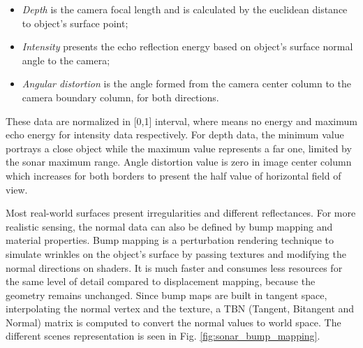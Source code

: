 \documentclass[final,5p,times]{elsarticle}
\begin{document}
\begin{itemize}[(a)]
    \item \textit{Depth} is the camera focal length and is calculated by the euclidean distance to object's surface point;
    \item \textit{Intensity} presents the echo reflection energy based on object's surface normal angle to the camera;
    \item \textit{Angular distortion} is the angle formed from the camera center column to the camera boundary column, for both directions.
\end{itemize}

These data are normalized in [0,1] interval, where means no energy and maximum echo energy for intensity data respectively. For depth data, the minimum value portrays a close object while the maximum value represents a far one, limited by the sonar maximum range. Angle distortion value is zero in image center column which increases for both borders to present the half value of horizontal field of view.

Most real-world surfaces present irregularities and different reflectances. For more realistic sensing, the normal data can also be defined by bump mapping and material properties. Bump mapping is a perturbation rendering technique to simulate wrinkles on the object's surface by passing textures and modifying the normal directions on shaders. It is much faster and consumes less resources for the same level of detail compared to displacement mapping, because the geometry remains unchanged. Since bump maps are built in tangent space, interpolating the normal vertex and the texture, a TBN (Tangent, Bitangent and Normal) matrix is computed to convert the normal values to world space. The different scenes representation is seen in Fig. \ref{fig:sonar_bump_mapping}.
\end{document}

